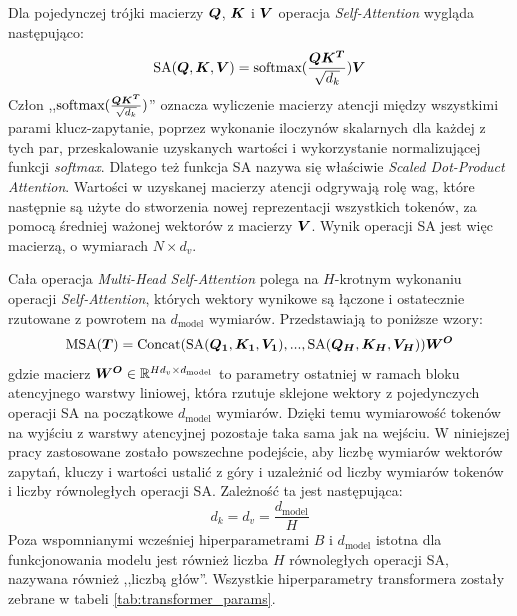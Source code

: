 Dla pojedynczej trójki macierzy $\boldsymbol{Q}$, $\boldsymbol{K}$ i $\boldsymbol{V}$ operacja \emph{Self-Attention} wygląda następująco:
\begin{equation} \label{eq:sa}
    \textrm{SA}(\boldsymbol{Q}, \boldsymbol{K}, \boldsymbol{V}) = \textrm{softmax}(\frac{\boldsymbol{Q}\boldsymbol{K^T}}{\sqrt{d_k}})\boldsymbol{V}
\end{equation}
Człon ,,$\textrm{softmax}(\frac{\boldsymbol{Q}\boldsymbol{K^T}}{\sqrt{d_k}})$'' oznacza wyliczenie macierzy atencji między wszystkimi parami klucz-zapytanie, poprzez wykonanie iloczynów skalarnych dla każdej z tych par, przeskalowanie uzyskanych wartości i wykorzystanie normalizującej funkcji \emph{softmax}. Dlatego też funkcja SA nazywa się właściwie \emph{Scaled Dot-Product Attention}.  Wartości w uzyskanej macierzy atencji odgrywają rolę wag, które następnie są użyte do stworzenia nowej reprezentacji wszystkich tokenów, za pomocą średniej ważonej wektorów z macierzy $\boldsymbol{V}$.  Wynik operacji SA jest więc macierzą, o wymiarach $N \times d_v$.

Cała operacja \emph{Multi-Head Self-Attention} polega na $H$-krotnym wykonaniu operacji \emph{Self-Attention}, których wektory wynikowe są łączone i ostatecznie rzutowane z powrotem na $d_{\mathrm{model}}$ wymiarów. Przedstawiają to poniższe wzory:
\begin{equation}
    \textrm{MSA}(\boldsymbol{T}) = \textrm{Concat}(\textrm{SA}(\boldsymbol{Q_1}, \boldsymbol{K_1}, \boldsymbol{V_1}), ..., \textrm{SA}(\boldsymbol{Q_H},
    \boldsymbol{K_H}, \boldsymbol{V_H}))\boldsymbol{W^O}
\end{equation}
gdzie macierz $\boldsymbol{W^O} \in \mathbb{R}^{Hd_v \times d_{\mathrm{model}}}$ to parametry ostatniej w ramach bloku atencyjnego warstwy liniowej, która rzutuje sklejone wektory z pojedynczych operacji SA na początkowe $d_{\mathrm{model}}$ wymiarów. Dzięki temu wymiarowość tokenów na wyjściu z warstwy atencyjnej pozostaje taka sama jak na wejściu. W niniejszej pracy zastosowane zostało powszechne podejście, aby liczbę wymiarów wektorów zapytań, kluczy i wartości ustalić z góry i uzależnić od liczby wymiarów tokenów i liczby równoległych operacji SA. Zależność ta jest następująca:
\begin{equation}
    d_k = d_v = \frac{d_{\mathrm{model}}}{H}
\end{equation}
Poza wspomnianymi wcześniej hiperparametrami $B$ i $d_{\mathrm{model}}$ istotna dla funkcjonowania modelu jest również liczba $H$ równoległych operacji SA, nazywana również ,,liczbą głów''. Wszystkie hiperparametry transformera zostały zebrane w tabeli \ref{tab:transformer_params}.

